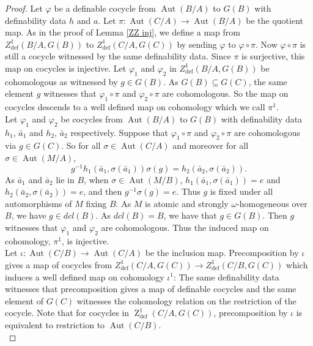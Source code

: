 \documentclass[10pt,a4paper]{amsart}
\DeclareMathOperator{\ZZ}{Z} %
\DeclareMathOperator{\aut}{Aut} %
\DeclareMathOperator{\defin}{def} %
\begin{document}
\begin{proof}
Let $\varphi$ be a definable cocycle from $\aut(B/A)$ to $G(B)$ with definability data $h$ and $a$. Let $\pi:\aut(C/A) \to \aut(B/A)$ be the quotient map. As in the proof of Lemma \ref{ZZ inj}, we define a map from $Z^1_{\defin}(B/A,G(B))$ to $Z^1_{\defin}(C/A,G(C))$ by sending $\varphi$ to $\varphi \circ \pi$. Now $\varphi \circ \pi$ is still a cocycle witnessed by the same definability data. Since $\pi$ is surjective, this map on cocycles is injective. Let $\varphi_1$ and $\varphi_2$ in  $Z^1_{\defin}(B/A,G(B))$ be cohomologous as witnessed by $g \in G(B)$. As $G(B) \subseteq G(C)$, the same element $g$ witnesses that $\varphi_1 \circ \pi$ and $\varphi_2 \circ \pi$ are cohomologous. So the map on cocycles descends to a well defined map on cohomology which we call $\pi^1$.\\

Let $\varphi_1$ and $\varphi_2$ be cocycles from $\aut(B/A)$ to $G(B)$ with definability data $h_1$, $\bar{a}_1$ and $h_2$, $\bar{a}_2$ respectively. Suppose that $\varphi_1 \circ \pi$ and $\varphi_2\circ\pi$ are cohomologous via $g \in G(C)$. So for all $\sigma \in \aut(C/A)$ and moreover for all $\sigma \in \aut(M/A)$, $$g^{-1}h_1(\bar{a}_1,\sigma(\bar{a}_1))\sigma(g) = h_2(\bar{a}_2,\sigma(\bar{a}_2)).$$ As $\bar{a}_1$ and $\bar{a}_2$ lie in $B$, when $\sigma \in \aut(M/B)$, $h_1(\bar{a}_1,\sigma(\bar{a}_1)) = e$ and $h_2(\bar{a}_2,\sigma(\bar{a}_2)) = e$, and then $g^{-1}\sigma(g) = e$. Thus $g$ is fixed under all automorphisms of $M$ fixing $B$. As $M$ is atomic and strongly $\omega$-homogeneous over $B$, we have $g \in dcl(B)$. As $dcl(B) = B$, we have that $g \in G(B)$. Then $g$ witnesses that $\varphi_1$ and $\varphi_2$ are cohomologous. Thus the induced map on cohomology, $\pi^1$, is injective.\\

Let $\iota:\aut(C/B) \to \aut(C/A)$ be the inclusion map. Precomposition by $\iota$ gives a map of cocycles from $Z^1_{\defin}(C/A,G(C)) \to Z^1_{\defin}(C/B,G(C))$ which induces a well defined map on cohomology $\iota^1$: The same definability data witnesses that precomposition gives a map of definable cocycles and the same element of $G(C)$ witnesses the cohomology relation on the restriction of the cocycle. Note that for cocycles in $\ZZ^1_{\defin}(C/A,G(C))$, precomposition by $\iota$ is equivalent to restriction to $\aut(C/B)$.  \\


\end{proof}
\end{document}
